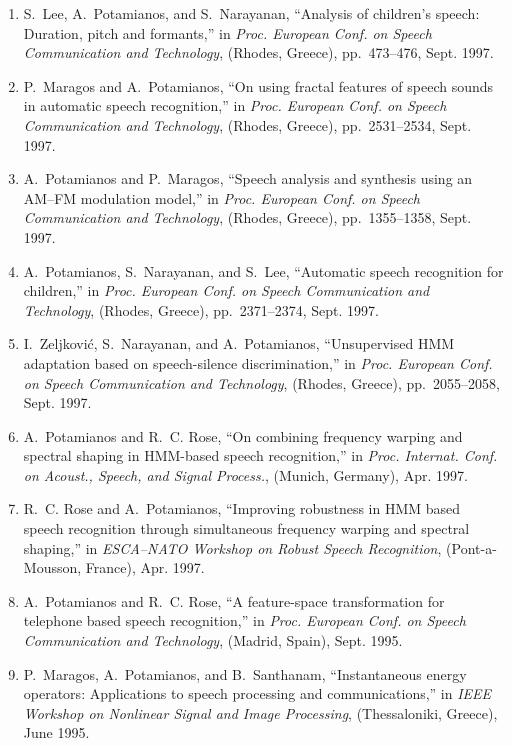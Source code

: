 \begin{enumerate}
\item
S.~Lee, A.~Potamianos, and S.~Narayanan, ``Analysis of children's speech:
  Duration, pitch and formants,'' in {\em Proc. European Conf. on Speech
  Communication and Technology}, (Rhodes, Greece), pp.~473--476, Sept. 1997.

\item
P.~Maragos and A.~Potamianos, ``On using fractal features of speech sounds in
  automatic speech recognition,'' in {\em Proc. European Conf. on Speech
  Communication and Technology}, (Rhodes, Greece), pp.~2531--2534, Sept. 1997.

\item
A.~Potamianos and P.~Maragos, ``Speech analysis and synthesis using an
  {AM}--{FM} modulation model,'' in {\em Proc. European Conf. on Speech
  Communication and Technology}, (Rhodes, Greece), pp.~1355--1358, Sept. 1997.

\item
A.~Potamianos, S.~Narayanan, and S.~Lee, ``Automatic speech recognition for
  children,'' in {\em Proc. European Conf. on Speech Communication and
  Technology}, (Rhodes, Greece), pp.~2371--2374, Sept. 1997.

\item
I.~Zeljkovi\'c, S.~Narayanan, and A.~Potamianos, ``Unsupervised {HMM}
  adaptation based on speech-silence discrimination,'' in {\em Proc. European
  Conf. on Speech Communication and Technology}, (Rhodes, Greece),
  pp.~2055--2058, Sept. 1997.

\item
A.~Potamianos and R.~C. Rose, ``On combining frequency warping and spectral
  shaping in {HMM}-based speech recognition,'' in {\em Proc. Internat. Conf. on
  Acoust., Speech, and Signal Process.}, (Munich, Germany), Apr. 1997.

\item
R.~C. Rose and A.~Potamianos, ``Improving robustness in {HMM} based speech
  recognition through simultaneous frequency warping and spectral shaping,'' in
  {\em {ESCA}--{NATO} Workshop on Robust Speech Recognition}, (Pont-a-Mousson,
  France), Apr. 1997.

\item
A.~Potamianos and R.~C. Rose, ``A feature-space transformation for telephone
  based speech recognition,'' in {\em Proc. European Conf. on Speech
  Communication and Technology}, (Madrid, Spain), Sept. 1995.

\item
P.~Maragos, A.~Potamianos, and B.~Santhanam, ``Instantaneous energy operators:
  Applications to speech processing and communications,'' in {\em IEEE Workshop
  on Nonlinear Signal and Image Processing}, (Thessaloniki, Greece), June 1995.


\end{enumerate}
